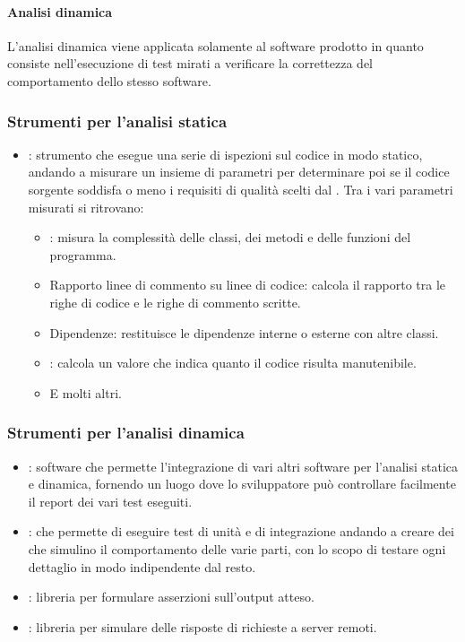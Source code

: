 \paragraph{Analisi dinamica}
L'analisi dinamica viene applicata solamente al software prodotto in quanto consiste nell'esecuzione di test mirati a verificare la correttezza del comportamento dello stesso software.


\subsubsection{Strumenti per l'analisi statica}
\begin{itemize}
  \item \textbf{}: strumento che esegue una serie di ispezioni sul codice in modo statico, andando a misurare un insieme di parametri per determinare poi se il codice sorgente soddisfa o meno i requisiti di qualità scelti dal . Tra i vari parametri misurati si ritrovano:
  \begin{itemize}
    \item \textbf{}: misura la complessità delle classi, dei metodi e delle funzioni del programma.
    \item Rapporto linee di commento su linee di codice: calcola il rapporto tra
    le righe di codice e le righe di commento scritte.
    \item Dipendenze: restituisce le dipendenze interne o esterne con altre
    classi.
    \item \textbf{}: calcola un valore che indica quanto il
    codice risulta manutenibile.
    \item E molti altri.
  \end{itemize}
\end{itemize}

\subsubsection{Strumenti per l'analisi dinamica}
\begin{itemize}
  \item \textbf{}: software che permette l'integrazione di vari altri software per l'analisi statica e dinamica, fornendo un luogo dove lo sviluppatore può controllare facilmente il report dei vari test eseguiti.
  \item \textbf{}:  che permette di eseguire test di unità e di integrazione andando a creare dei  che simulino il comportamento delle varie parti, con lo scopo di testare ogni dettaglio in modo indipendente dal resto.
  \item \textbf{}: libreria per formulare asserzioni sull'output atteso.
  \item \textbf{}: libreria per simulare delle risposte di richieste a server remoti.

\end{itemize}



